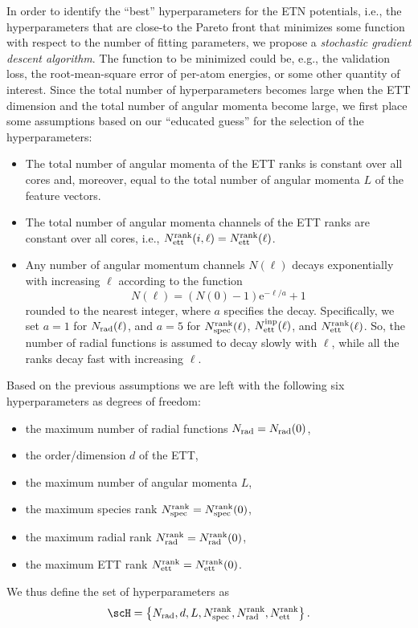 In order to identify the ``best'' hyperparameters for the ETN potentials, i.e., the hyperparameters that are close-to the Pareto front that minimizes some function with respect to the number of fitting parameters, we propose a \emph{stochastic gradient descent algorithm}.
The function to be minimized could be, e.g., the validation loss, the root-mean-square error of per-atom energies, or some other quantity of interest.
Since the total number of hyperparameters becomes large when the ETT dimension and the total number of angular momenta become large, we first place some assumptions based on our  ``educated guess'' for the selection of the hyperparameters:
\begin{itemize}
    \item
    The total number of angular momenta of the ETT ranks is constant over all cores and, moreover, equal to the total number of angular momenta $L$ of the feature vectors.
    \item
    The total number of angular momenta channels of the ETT ranks are constant over all cores, i.e., $N_{\rm ett}^{\rm rank}(i,\ell) = N_{\rm ett}^{\rm rank}(\ell)$.
    \item
    Any number of angular momentum channels $N(\ell)$ decays exponentially with increasing $\ell$ according to the function
    \begin{equation}\label{eq:decay-channels}
        N(\ell) = (N(0) - 1) \mathrm{e}^{-\ell/a} + 1
    \end{equation}
    rounded to the nearest integer, where $a$ specifies the decay.
    Specifically, we set $a = 1$ for $N_{\rm rad}(\ell)$, and $a = 5$ for $N_{\rm spec}^{\rm rank}(\ell)$, $N_{\rm ett}^{\rm inp}(\ell)$, and $N_{\rm ett}^{\rm rank}(\ell)$.
    So, the number of radial functions is assumed to decay slowly with $\ell$, while all the ranks decay fast with increasing $\ell$.
\end{itemize}
Based on the previous assumptions we are left with the following six hyperparameters as degrees of freedom:
\begin{itemize}
    \item
    the maximum number of radial functions $N_{\rm rad} = N_{\rm rad}(0)$,
    \item
    the order/dimension $d$ of the ETT,
    \item
    the maximum number of angular momenta $L$,
    \item
    the maximum species rank $N_{\rm spec}^{\rm rank} = N_{\rm spec}^{\rm rank}(0)$,
    \item
    the maximum radial rank $N_{\rm rad}^{\rm rank} = N_{\rm rad}^{\rm rank}(0)$,
    \item
    the maximum ETT rank $N_{\rm ett}^{\rm rank} = N_{\rm ett}^{\rm rank}(0)$.
\end{itemize}
We thus define the set of hyperparameters as
\begin{equation}
    \scH = \left\{ N_{\rm rad}, d, L, N_{\rm spec}^{\rm rank}, N_{\rm rad}^{\rm rank}, N_{\rm ett}^{\rm rank} \right\}.
\end{equation}

